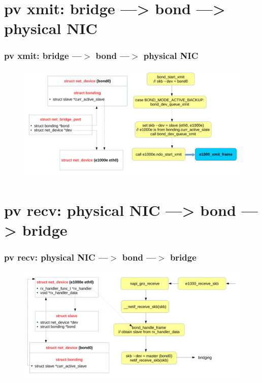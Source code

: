 \documentclass[aspectratio=169]{beamer}
\begin{document}
\section{pv xmit: bridge ---> bond ---> physical NIC}
\begin{frame}
\frametitle{pv xmit: bridge ---$>$ bond ---$>$ physical NIC}
\begin{figure}
\includegraphics[width=1.0\linewidth]{figures/bridge_to_bond.pdf}
\end{figure}
\end{frame}


\section{pv recv: physical NIC ---> bond ---> bridge}
\begin{frame}
\frametitle{pv recv: physical NIC ---$>$ bond ---$>$ bridge}
\begin{figure}
\includegraphics[width=1.0\linewidth]{figures/bond_to_bridge.pdf}
\end{figure}
\end{frame}

\end{document}
